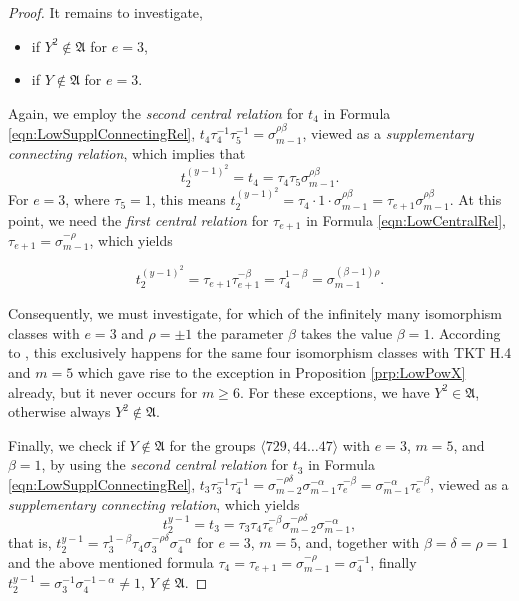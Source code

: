 \documentclass{amsart}
\theoremstyle{definition}
\numberwithin{equation}{section}
\begin{document}
\begin{proof}
It remains to investigate,

\begin{itemize}
\item
if \(Y^2\not\in\mathfrak{A}\) for \(e=3\),
\item
if \(Y\not\in\mathfrak{A}\) for \(e=3\).
\end{itemize}

\noindent
Again, we employ the \textit{second central relation} for \(t_4\) in Formula
\eqref{eqn:LowSupplConnectingRel},
\(t_4\tau_4^{-1}\tau_5^{-1}=\sigma_{m-1}^{\rho\beta}\),
viewed as a \textit{supplementary connecting relation},
which implies that
\[t_2^{(y-1)^2}=t_4=\tau_4\tau_5\sigma_{m-1}^{\rho\beta}.\]
For \(e=3\), where \(\tau_5=1\), this means
\(t_2^{(y-1)^2}=\tau_4\cdot 1\cdot\sigma_{m-1}^{\rho\beta}=\tau_{e+1}\sigma_{m-1}^{\rho\beta}\).
At this point, we need the \textit{first central relation} for \(\tau_{e+1}\) in Formula
\eqref{eqn:LowCentralRel},
\(\tau_{e+1}=\sigma_{m-1}^{-\rho}\),
which yields

\begin{equation}
\label{eqn:SecCentralRel}
t_2^{(y-1)^2}=\tau_{e+1}\tau_{e+1}^{-\beta}=\tau_{4}^{1-\beta}=\sigma_{m-1}^{(\beta-1)\rho}.
\end{equation}

\noindent
Consequently, we must investigate, for which of the infinitely many isomorphism classes
with \(e=3\) and \(\rho=\pm 1\) the parameter \(\beta\) takes the value \(\beta=1\). 
According to
\cite[pp. 13--33]{Ne2},
this exclusively happens for the same four isomorphism classes with TKT H.4 and \(m=5\)
which gave rise to the exception in Proposition
\ref{prp:LowPowX}
already, but it never occurs for \(m\ge 6\).
For these exceptions, we have \(Y^2\in\mathfrak{A}\), otherwise always \(Y^2\notin\mathfrak{A}\).

Finally, we check
if \(Y\not\in\mathfrak{A}\) for the groups \(\langle 729,44\ldots 47\rangle\)
with \(e=3\), \(m=5\), and \(\beta=1\),
by using the \textit{second central relation} for \(t_3\) in Formula
\eqref{eqn:LowSupplConnectingRel},
\(t_3\tau_3^{-1}\tau_4^{-1}=\sigma_{m-2}^{-\rho\delta}\sigma_{m-1}^{-\alpha}\tau_e^{-\beta}=\sigma_{m-1}^{-\alpha}\tau_e^{-\beta}\),
viewed as a \textit{supplementary connecting relation},
which yields
\[t_2^{y-1}=t_3=\tau_3\tau_4\tau_e^{-\beta}\sigma_{m-2}^{-\rho\delta}\sigma_{m-1}^{-\alpha},\]
that is, \(t_2^{y-1}=\tau_3^{1-\beta}\tau_4\sigma_{3}^{-\rho\delta}\sigma_{4}^{-\alpha}\) for \(e=3\), \(m=5\),
and, together with \(\beta=\delta=\rho=1\) and the above mentioned formula \(\tau_{4}=\tau_{e+1}=\sigma_{m-1}^{-\rho}=\sigma_{4}^{-1}\),
finally \(t_2^{y-1}=\sigma_{3}^{-1}\sigma_{4}^{-1-\alpha}\ne 1\), \(Y\notin\mathfrak{A}\).
\end{proof}
\end{document}
